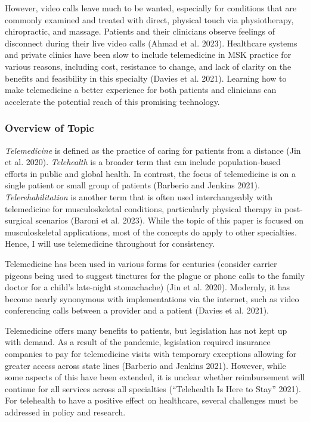 \documentclass[
  letterpaper,
]{article}
\begin{document}
However, video calls leave much to be wanted, especially for conditions
that are commonly examined and treated with direct, physical touch via
physiotherapy, chiropractic, and massage. Patients and their clinicians
observe feelings of disconnect during their live video calls (Ahmad et
al. 2023). Healthcare systems and private clinics have been slow to
include telemedicine in MSK practice for various reasons, including
cost, resistance to change, and lack of clarity on the benefits and
feasibility in this specialty (Davies et al. 2021). Learning how to make
telemedicine a better experience for both patients and clinicians can
accelerate the potential reach of this promising technology.

\begin{figure}

\end{figure}%

\subsubsection{Overview of Topic}\label{overview-of-topic}

\emph{Telemedicine} is defined as the practice of caring for patients
from a distance (Jin et al. 2020). \emph{Telehealth} is a broader term
that can include population-based efforts in public and global health.
In contrast, the focus of telemedicine is on a single patient or small
group of patients (Barberio and Jenkins 2021). \emph{Telerehabilitation}
is another term that is often used interchangeably with telemedicine for
musculoskeletal conditions, particularly physical therapy in
post-surgical scenarios (Baroni et al. 2023). While the topic of this
paper is focused on musculoskeletal applications, most of the concepts
do apply to other specialties. Hence, I will use telemedicine throughout
for consistency.

Telemedicine has been used in various forms for centuries (consider
carrier pigeons being used to suggest tinctures for the plague or phone
calls to the family doctor for a child's late-night stomachache) (Jin et
al. 2020). Modernly, it has become nearly synonymous with
implementations via the internet, such as video conferencing calls
between a provider and a patient (Davies et al. 2021).

Telemedicine offers many benefits to patients, but legislation has not
kept up with demand. As a result of the pandemic, legislation required
insurance companies to pay for telemedicine visits with temporary
exceptions allowing for greater access across state lines (Barberio and
Jenkins 2021). However, while some aspects of this have been extended,
it is unclear whether reimbursement will continue for all services
across all specialties ({``Telehealth Is Here to Stay''} 2021). For
telehealth to have a positive effect on healthcare, several challenges
must be addressed in policy and research.
\end{document}
